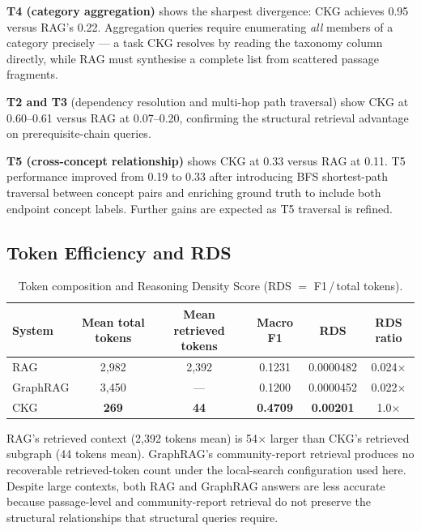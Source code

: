 \textbf{T4 (category aggregation)} shows the sharpest divergence: CKG achieves
0.95 versus RAG's 0.22. Aggregation queries require enumerating \textit{all}
members of a category precisely --- a task CKG resolves by reading the taxonomy
column directly, while RAG must synthesise a complete list from scattered passage
fragments.

\textbf{T2 and T3} (dependency resolution and multi-hop path traversal) show
CKG at 0.60--0.61 versus RAG at 0.07--0.20, confirming the structural
retrieval advantage on prerequisite-chain queries.

\textbf{T5 (cross-concept relationship)} shows CKG at 0.33 versus RAG at 0.11.
T5 performance improved from 0.19 to 0.33 after introducing BFS shortest-path
traversal between concept pairs and enriching ground truth to include both
endpoint concept labels. Further gains are expected as T5 traversal is refined.

\subsection{Token Efficiency and RDS}\label{sec:rds}

\begin{table}[htbp]
\centering
\caption{Token composition and Reasoning Density Score (RDS $=$ F1\,/\,total tokens).}
\label{tab:rds}
\begin{tabular}{lccccc}
\toprule
\textbf{System} & \textbf{Mean total tokens} & \textbf{Mean retrieved tokens} & \textbf{Macro F1} & \textbf{RDS} & \textbf{RDS ratio} \\
\midrule
RAG      & 2{,}982 & 2{,}392 & 0.1231 & 0.0000482  & 0.024$\times$ \\
GraphRAG & 3{,}450 & ---     & 0.1200 & 0.0000452  & 0.022$\times$ \\
CKG      & \textbf{269} & \textbf{44} & \textbf{0.4709} & \textbf{0.00201} & 1.0$\times$ \\
\bottomrule
\end{tabular}
\end{table}

RAG's retrieved context (2,392 tokens mean) is 54$\times$ larger than CKG's
retrieved subgraph (44 tokens mean). GraphRAG's community-report retrieval
produces no recoverable retrieved-token count under the local-search
configuration used here. Despite large contexts, both RAG and GraphRAG
answers are less accurate because passage-level and community-report
retrieval do not preserve the structural relationships that structural
queries require.

